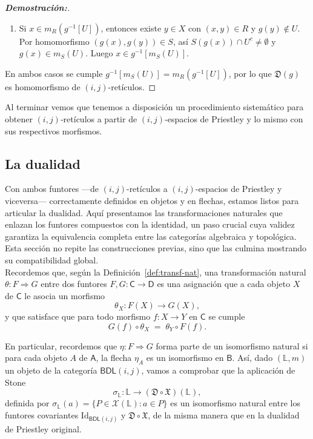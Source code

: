 \documentclass[12pt]{book}
\newcommand{\Id}{\mathrm{Id}}
\newcommand{\BDL}{\mathsf{BDL}}
\newcommand{\D}{\mathfrak{D}}
\begin{document}
\begin{proof}[{\textbf{Demostración:}}]
\begin{itemize}
\begin{enumerate}
  \item[$\supseteq$)] Si \(x\in m_{R}(g^{-1}[U])\), entonces existe \(y\in X\) con \((x,y)\in R\) y \(g(y)\notin U\). Por homomorfismo \((g(x),g(y))\in S\), así \(S(g(x))\cap U^{c}\neq\emptyset\) y \(g(x)\in m_{S}(U)\). Luego \(x\in g^{-1}[m_{S}(U)]\).
\end{enumerate}
\end{itemize}

En ambos casos se cumple \(g^{-1}[m_{S}(U)]=m_{R}(g^{-1}[U])\), por lo que \(\D(g)\) es homomorfismo de \((i,j)\)-retículos.
\end{proof}
Al terminar vemos que tenemos a disposición un procedimiento sistemático para obtener $(i,j)$‑retículos a partir de $(i,j)$-espacios de Priestley y lo mismo con sus respectivos morfismos.


\subsection{La dualidad}

Con ambos funtores —de $(i,j)$-retículos a $(i,j)$-espacios de Priestley y viceversa— correctamente definidos en objetos y en flechas, estamos listos para articular la dualidad. Aquí presentamos las transformaciones naturales que enlazan los funtores compuestos con la identidad, un paso crucial cuya validez garantiza la equivalencia completa entre las categorías algebraica y topológica. Esta sección no repite las construcciones previas, sino que las culmina mostrando su compatibilidad global.\\


Recordemos que, según la Definición~\ref{def:transf-nat},  
una transformación natural \(\theta\colon F\Rightarrow G\) entre dos funtores
\(F,G\colon\mathsf C\to\mathsf D\)
es una asignación que a cada objeto \(X\) de \(\mathsf C\) le asocia un morfismo
\[
\theta_X\colon F(X)\longrightarrow G(X),
\]
y que satisface que para todo morfismo \(f\colon X\to Y\) en \(\mathsf C\) se cumple
\[
G(f)\circ \theta_X \;=\; \theta_Y \circ F(f).
\]


En particular, recordemos que $\eta\colon F\Rightarrow G$ forma parte de un isomorfismo natural si para cada objeto $A$ de $\mathsf{A}$, la flecha $\eta_{A}$ es un isomorfismo en $\mathsf B$. Así, dado $(\mathbb{L},m)$ un objeto de la categoría $\BDL(i,j)$, vamos a comprobar que la aplicación de Stone
\[ \sigma_{\mathbb{L}} \colon \mathbb{L} \rightarrow (\D \circ \mathfrak{X})(\mathbb{L}), \]
definida por $\sigma_{\mathbb{L}}(a) = \{ P \in \mathcal{X}(\mathbb{L}) \colon a \in P \}$ es un isomorfismo natural entre los funtores covariantes $\Id_{\BDL(i,j)}$ y  $\D \circ \mathfrak{X}$, de la misma manera que en la dualidad de Priestley original.
\end{document}
